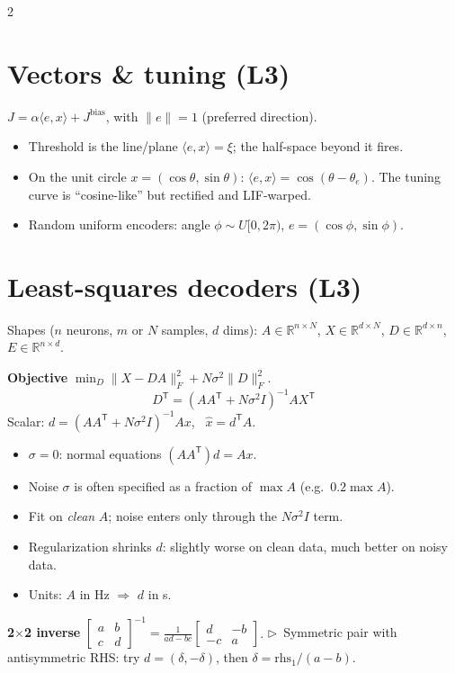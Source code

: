 \documentclass[9pt,letterpaper]{extarticle}
\newcommand{\sub}[1]{\par\vspace{2pt}\textbf{#1}\quad}
\newcommand{\tip}[1]{{\color{BrickRed}\small$\triangleright$~#1}}
\newcommand{\T}{\mathsf{T}}
\newcommand{\Jb}{J^{\mathrm{bias}}}
\begin{document}
\begin{multicols}{2}
\section{Vectors \& tuning (L3)}
$J = \alpha\langle e, x\rangle + \Jb$, with $\|e\| = 1$ (preferred direction).
\begin{itemize}
\item Threshold is the line/plane $\langle e, x\rangle = \xi$; the half-space beyond it fires.
\item On the unit circle $x = (\cos\theta, \sin\theta)$: $\langle e, x\rangle = \cos(\theta - \theta_e)$. The tuning curve is ``cosine-like'' but rectified and LIF-warped.
\item Random uniform encoders: angle $\phi \sim U[0, 2\pi)$, $e = (\cos\phi, \sin\phi)$.
\end{itemize}

\section{Least-squares decoders (L3)}
Shapes ($n$ neurons, $m$ or $N$ samples, $d$ dims): $A \in \mathbb{R}^{n\times N}$, $X \in \mathbb{R}^{d\times N}$, $D \in \mathbb{R}^{d\times n}$, $E \in \mathbb{R}^{n\times d}$.
\sub{Objective} $\min_D \|X - DA\|_F^2 + N\sigma^2\|D\|_F^2$.
\[
\boxed{D^\T = (AA^\T + N\sigma^2 I)^{-1}AX^\T}
\]
Scalar: $d = (AA^\T + N\sigma^2 I)^{-1}Ax$, \ $\hat x = d^\T A$.
\begin{itemize}
\item $\sigma = 0$: normal equations $(AA^\T)d = Ax$.
\item Noise $\sigma$ is often specified as a fraction of $\max A$ (e.g.\ $0.2\max A$).
\item Fit on \emph{clean} $A$; noise enters only through the $N\sigma^2 I$ term.
\item Regularization shrinks $d$: slightly worse on clean data, much better on noisy data.
\item Units: $A$ in Hz $\Rightarrow$ $d$ in s.
\end{itemize}
\sub{2$\times$2 inverse} $\begin{bmatrix} a & b\\ c & d\end{bmatrix}^{-1} = \frac{1}{ad - bc}\begin{bmatrix} d & -b \\ -c & a\end{bmatrix}$.
\tip{Symmetric pair with antisymmetric RHS: try $d = (\delta, -\delta)$, then $\delta = \text{rhs}_1/(a - b)$.}


\end{multicols}
\end{document}
